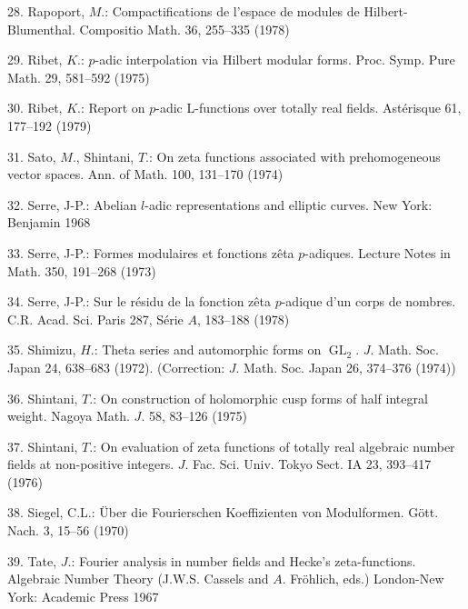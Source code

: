 \documentclass[11pt]{article}
\begin{document}
\par
28. Rapoport, \(M\).: Compactifications de l’espace de modules de Hilbert-Blumenthal. Compositio Math. 36, 255--335 (1978)\par
\par
29. Ribet, \(K\).: \(p\)-adic interpolation via Hilbert modular forms. Proc. Symp. Pure Math. 29, 581--592 (1975)\par
\par
30. Ribet, \(K\).: Report on \(p\)-adic L-functions over totally real fields. Astérisque 61, 177--192 (1979)\par
\par
31. Sato, \(M\)., Shintani, \(T\).: On zeta functions associated with prehomogeneous vector spaces. Ann. of Math. 100, 131--170 (1974)\par
\par
32. Serre, J-P.: Abelian \(l\)-adic representations and elliptic curves. New York: Benjamin 1968\par
\par
33. Serre, J-P.: Formes modulaires et fonctions zêta \(p\)-adiques. Lecture Notes in Math. 350, 191--268 (1973)\par
\par
34. Serre, J-P.: Sur le résidu de la fonction zêta \(p\)-adique d’un corps de nombres. C.R. Acad. Sci. Paris 287, Série \(A\), 183--188 (1978)\par
\par
35. Shimizu, \(H\).: Theta series and automorphic forms on \(\operatorname{GL}_{2}\). \(J\). Math. Soc. Japan 24, 638--683 (1972). (Correction: \(J\). Math. Soc. Japan 26, 374--376 (1974))\par
\par
36. Shintani, \(T\).: On construction of holomorphic cusp forms of half integral weight. Nagoya Math. \(J\). 58, 83--126 (1975)\par
\par
37. Shintani, \(T\).: On evaluation of zeta functions of totally real algebraic number fields at non-positive integers. \(J\). Fac. Sci. Univ. Tokyo Sect. IA 23, 393--417 (1976)\par
\par
38. Siegel, C.L.: Über die Fourierschen Koeffizienten von Modulformen. Gött. Nach. 3, 15--56 (1970)\par
\par
39. Tate, \(J\).: Fourier analysis in number fields and Hecke’s zeta-functions. Algebraic Number Theory (J.W.S. Cassels and \(A\). Fröhlich, eds.) London-New York: Academic Press 1967\par
\end{document}
